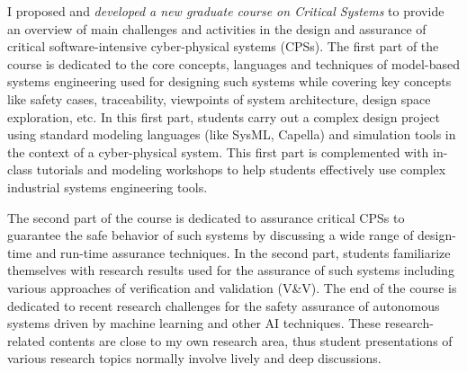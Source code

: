I proposed and \emph{developed a new graduate course on Critical Systems} to provide an overview of main challenges and activities in the design and assurance of critical software-intensive cyber-physical systems (CPSs). The first part of the course is dedicated to the core concepts, languages and techniques of model-based systems engineering used for designing such systems while covering key concepts like safety cases, traceability, viewpoints of system architecture, design space exploration, etc. In this first part, students carry out a complex design project using standard modeling languages (like SysML, Capella) and simulation tools in the context of a cyber-physical system. This first part is complemented with in-class tutorials and modeling workshops to help students effectively use complex industrial systems engineering tools.

The second part of the course is dedicated to assurance critical CPSs to guarantee the safe behavior of such systems by discussing a wide range of design-time and run-time assurance techniques. In the second part, students familiarize themselves with research results used for the assurance of such systems including various approaches of verification and validation (V\&V). The end of the course is dedicated to recent research challenges for the safety assurance of autonomous systems driven by machine learning and other AI techniques. These research-related contents are close to my own research area, thus student presentations of various research topics normally involve lively and deep discussions. 






